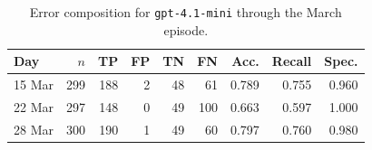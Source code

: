 \begin{table}[htbp]
    \centering
    \footnotesize
    \caption{Error composition for \texttt{gpt-4.1-mini} through the March episode.}
    \label{tab:episode-confusion}
    \begin{tabular}{lrrrrrrrr}
    \toprule
    Day & $n$ & TP & FP & TN & FN & Acc. & Recall & Spec. \\
    \midrule
    15 Mar & 299 & 188 & 2 & 48 & 61 & 0.789 & 0.755 & 0.960 \\
    22 Mar & 297 & 148 & 0 & 49 & 100 & 0.663 & 0.597 & 1.000 \\
    28 Mar & 300 & 190 & 1 & 49 & 60 & 0.797 & 0.760 & 0.980 \\
    \bottomrule
    \end{tabular}
\end{table}
